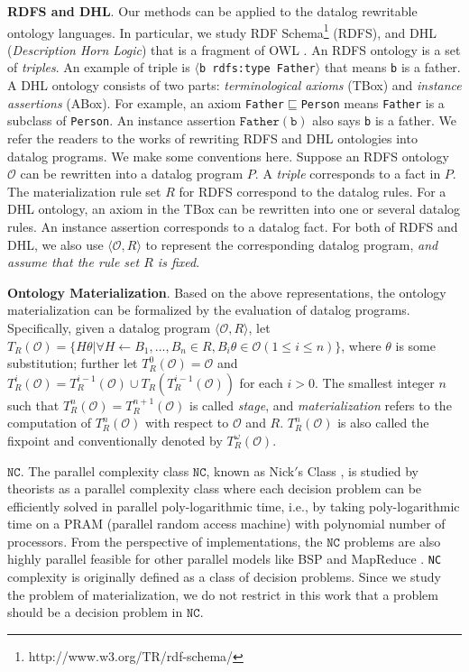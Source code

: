 \documentclass{article}
\begin{document}
\textbf{RDFS and DHL}. Our methods can be applied to the datalog rewritable ontology languages. In particular, we study RDF Schema\footnote{http://www.w3.org/TR/rdf-schema/} (RDFS), and DHL (\emph{Description Horn Logic}) that is a fragment of OWL \cite{DBLP:conf/www/GrosofHVD03}. An RDFS ontology is a set of \emph{triples}. An example of triple is
$\langle$\texttt{b rdfs:type Father}$\rangle$ that means \texttt{b} is a father. A DHL ontology consists of two parts: \emph{terminological axioms} (TBox) and \emph{instance assertions} (ABox). For example, an axiom \texttt{Father$\sqsubseteq$Person} means \texttt{Father} is a subclass of \texttt{Person}. An instance assertion $\texttt{Father}(\texttt{b})$ also says \texttt{b} is a father.
We refer the readers to the works \cite{DBLP:conf/www/GrosofHVD03,DBLP:conf/www/HorrocksP04} of rewriting RDFS and DHL ontologies into datalog programs. We make some conventions here. Suppose an RDFS ontology $\mathcal{O}$
can be rewritten into a datalog program $P$. A \emph{triple} corresponds to a fact in $P$. The materialization rule set $R$ for RDFS correspond to the datalog rules. For a DHL ontology, an axiom in the TBox can be rewritten into one or several datalog rules. An instance assertion corresponds to a datalog fact.
For both of RDFS and DHL, we also use $\langle\mathcal{O}, R\rangle$ to represent the corresponding datalog program, \emph{and assume that the rule set $R$ is fixed}.

\textbf{Ontology Materialization}. Based on the above representations, the ontology materialization can be formalized by the evaluation of datalog programs. Specifically, given a datalog program $\langle\mathcal{O}, R\rangle$, let $T_R(\mathcal{O})=\{H\theta|\forall H\leftarrow B_1,...,B_n\in R, B_i\theta\in\mathcal{O} (1\leq i\leq n)\}$, where $\theta$ is some substitution; further let $T_R^{0}(\mathcal{O})=\mathcal{O}$ and $T_R^{i}(\mathcal{O})=T_R^{i-1}(\mathcal{O})\cup T_R(T_R^{i-1}(\mathcal{O}))$ for each $i>0$. The
smallest integer $n$ such that $T_R^{n}(\mathcal{O})= T_R^{n+1}(\mathcal{O})$ is called \emph{stage}, and \emph{materialization} refers to the computation of $T_R^{n}(\mathcal{O})$ with respect to $\mathcal{O}$ and $R$. $T_R^{n}(\mathcal{O})$ is also called the fixpoint and conventionally denoted by $T_R^{\omega}(\mathcal{O})$.

\textbf{$\texttt{NC}$}. The parallel complexity class $\texttt{NC}$, known as Nick$'$s Class \cite{RAYMOND-GREENLAW}, is studied by theorists as a parallel complexity class where each decision problem can be efficiently solved in parallel poly-logarithmic time, i.e., by taking
poly-logarithmic time on a PRAM (parallel random access machine) with polynomial number of processors.
From the
perspective of implementations, the $\texttt{NC}$ problems are also highly parallel feasible for
other parallel models like BSP \cite{DBLP:journals/cacm/Valiant90} and MapReduce \cite{DBLP:conf/soda/KarloffSV10}. \texttt{NC} complexity is originally defined as a class of decision problems. Since we study the problem of materialization, we do not restrict in this work that a
problem should be a decision problem in $\texttt{NC}$.
\end{document}
